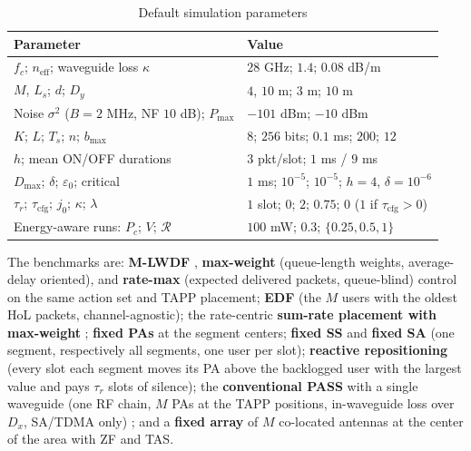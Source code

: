 \documentclass[journal]{IEEEtran}
\newcommand{\Dmax}{D_{\max}}
\newcommand{\Pmax}{P_{\max}}
\newcommand{\neff}{n_{\mathrm{eff}}}
\begin{document}
\begin{table}[t]
\caption{Default simulation parameters}
\label{tab:params}
\centering
\scriptsize
\setlength{\tabcolsep}{1.5pt}
\begin{tabular}{ll}
\toprule
Parameter & Value\\
\midrule
$f_c$; $\neff$; waveguide loss $\kappa$ & $28$ GHz; $1.4$; $0.08$ dB/m\\
$M$, $L_s$; $d$; $D_y$ & $4$, $10$ m; $3$ m; $10$ m\\
Noise $\sigma^2$ ($B=2$ MHz, NF $10$ dB); $\Pmax$ & $-101$ dBm; $-10$ dBm\\
$K$; $L$; $T_s$; $n$; $b_{\max}$ & $8$; $256$ bits; $0.1$ ms; $200$; $12$\\
$h$; mean ON/OFF durations & $3$ pkt/slot; $1$ ms / $9$ ms\\
$\Dmax$; $\delta$; $\varepsilon_0$; critical & $1$ ms; $10^{-5}$; $10^{-5}$; $h\!=\!4$, $\delta\!=\!10^{-6}$\\
$\tau_r$; $\tau_{\mathrm{cfg}}$; $j_0$; $\kappa$; $\lambda$ & $1$ slot; $0$; $2$; $0.75$; $0$ ($1$ if $\tau_{\mathrm{cfg}}\!>\!0$)\\
Energy-aware runs: $P_c$; $V$; $\mathcal R$ & $100$ mW; $0.3$; $\{0.25,0.5,1\}$\\
\bottomrule
\end{tabular}
\end{table}

The benchmarks are: \textbf{M-LWDF} \cite{Andrews2001}, \textbf{max-weight} (queue-length weights, average-delay oriented), and \textbf{rate-max} (expected delivered packets, queue-blind) control on the same action set and TAPP placement; \textbf{EDF} (the $M$ users with the oldest HoL packets, channel-agnostic); the rate-centric \textbf{sum-rate placement with max-weight} \cite{Ouyang2026SWAN,Gu2026SWANSumRate}; \textbf{fixed PAs} at the segment centers; \textbf{fixed SS} and \textbf{fixed SA} (one segment, respectively all segments, one user per slot); \textbf{reactive repositioning} (every slot each segment moves its PA above the backlogged user with the largest value and pays $\tau_r$ slots of silence); the \textbf{conventional PASS} with a single waveguide (one RF chain, $M$ PAs at the TAPP positions, in-waveguide loss over $D_x$, SA/TDMA only) \cite{Ding2025FlexibleAntenna}; and a \textbf{fixed array} of $M$ co-located antennas at the center of the area with ZF and TAS.
\end{document}
